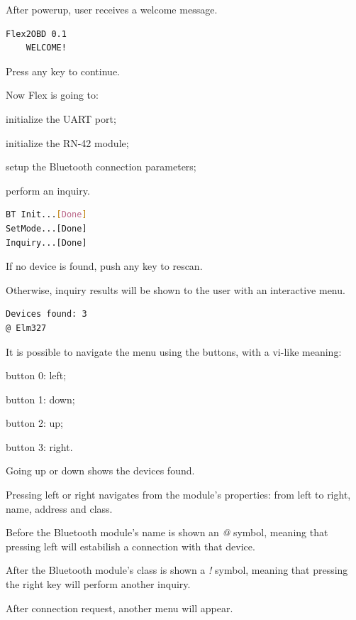 \documentclass[twoside]{article}
\begin{document}
\begin{multicols}{2}
After powerup, user receives a welcome message.

\begin{lstlisting}[language=bash]
  Flex2OBD 0.1
    WELCOME!
\end{lstlisting}

Press any key to continue.

Now Flex is going to:
\begin{compactitem}
  \item initialize the UART port;
  \item initialize the RN-42 module;
  \item setup the Bluetooth connection parameters;
  \item perform an inquiry.
\end{compactitem}

\begin{lstlisting}[language=bash]
BT Init...[Done]
SetMode...[Done]
Inquiry...[Done]
\end{lstlisting}

If no device is found, push any key to rescan.

Otherwise, inquiry results will be shown to the user with an interactive menu. 

\begin{lstlisting}[language=bash]
Devices found: 3
@ Elm327
\end{lstlisting}

It is possible to navigate the menu using the buttons, with a vi-like meaning:
\begin{compactitem}
  \item button 0: left;
  \item button 1: down;
  \item button 2: up;
  \item button 3: right.
\end{compactitem}

Going up or down shows the devices found.

Pressing left or right navigates from the module's properties: from left to right, name, address and class.

Before the Bluetooth module's name is shown an \emph{@} symbol, meaning that pressing left will estabilish a connection with that device.

After the Bluetooth module's class is shown a \emph{!} symbol, meaning that pressing the right key will perform another inquiry.

After connection request, another menu will appear.


\end{multicols}
\end{document}
